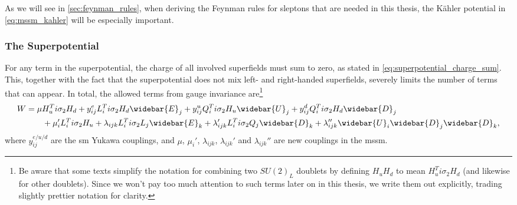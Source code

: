 As we will see in \cref{sec:feynman_rules}, when deriving the Feynman rules for sleptons that are needed in this thesis, the K\"ahler potential in \cref{eq:mssm_kahler} will be especially important.


\subsubsection{The Superpotential}

For any term in the superpotential, the charge of all involved superfields must sum to zero, as stated in \cref{eq:superpotential_charge_sum}. This, together with the fact that the superpotential does not mix left- and right-handed superfields, severely limits the number of terms that can appear.
In total, the allowed terms from gauge invariance are\footnote{Be aware that some texts simplify the notation for combining two $SU(2)_L$ doublets by defining $H_uH_d$ to mean $H_u^Ti\sigma_2H_d$ (and likewise for other doublets). Since we won't pay too much attention to such terms later on in this thesis, we write them out explicitly, trading slightly prettier notation for clarity.}
\begin{equation}
\label{eq:mssm_superpotential_R_violated}
\begin{split}
    W &= \mu H_u^Ti\sigma_2H_d + y_{ij}^e L_i^Ti\sigma_2H_d\widebar{E}_j + y_{ij}^u Q_i^Ti\sigma_2H_u\widebar{U}_j + y_{ij}^d Q_i^Ti\sigma_2H_d\widebar{D}_j
    \\ &\qquad
    + \mu_i' L_i^Ti\sigma_2H_u + \lambda_{ijk} L_i^Ti\sigma_2L_j\widebar{E}_k + \lambda_{ijk}' L_i^Ti\sigma_2Q_j\widebar{D}_k + \lambda_{ijk}'' \widebar{U}_i\widebar{D}_j\widebar{D}_k,
\end{split}
\end{equation}
where $y_{ij}^{e/u/d}$ are the \gls{sm} Yukawa couplings, and $\mu$, $\mu_i'$, $\lambda_{ijk}$, $\lambda_{ijk}'$ and $\lambda_{ijk}''$ are new couplings in the \gls{mssm}.

